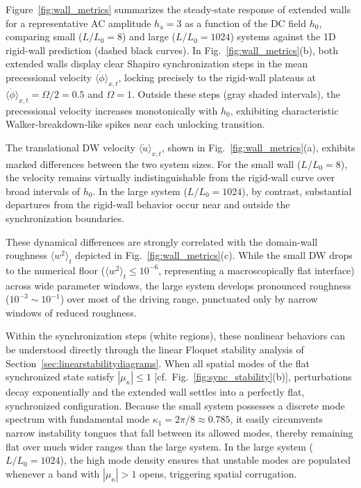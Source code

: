 \documentclass[prb,aps,twocolumn,superscriptaddress,floatfix]{revtex4-1}
\begin{document}
{{Figure~\ref{fig:wall_metrics} summarizes the steady-state response of extended walls for a representative AC amplitude $h_\text{a}=3$ as a function of the DC field $h_0$, comparing small ($L/L_0=8$) and large ($L/L_0=1024$) systems against the 1D rigid-wall prediction (dashed black curves). 
In Fig.~\ref{fig:wall_metrics}(b), both extended walls display clear Shapiro synchronization steps in the mean precessional velocity $\langle\dot\phi\rangle_{x,t}$, locking precisely to the rigid-wall plateaus at $\langle\dot\phi\rangle_{x,t} = \Omega/2 = 0.5$ and $\Omega = 1$. Outside these steps (gray shaded intervals), the precessional velocity increases monotonically with $h_0$, exhibiting characteristic Walker-breakdown-like spikes near each unlocking transition.

The translational DW velocity $\langle\dot u\rangle_{x,t}$, shown in Fig.~\ref{fig:wall_metrics}(a), exhibits marked differences between the two system sizes. For the small wall ($L/L_0=8$), the velocity remains virtually indistinguishable from the rigid-wall curve over broad intervals of $h_0$. In the large system ($L/L_0=1024$), by contrast, substantial departures from the rigid-wall behavior occur near and outside the synchronization boundaries.

These dynamical differences are strongly correlated with the domain-wall roughness $\langle w^2\rangle_t$ depicted in Fig.~\ref{fig:wall_metrics}(c). While the small DW drops to the numerical floor ($\langle w^2\rangle_t \le 10^{-6}$, representing a macroscopically flat interface) across wide parameter windows, the large system develops pronounced roughness ($10^{-3} \sim 10^{-1}$) over most of the driving range, punctuated only by narrow windows of reduced roughness.

Within the synchronization steps (white regions), these nonlinear behaviors can be understood directly through the linear Floquet stability analysis of Section~\ref{sec:linearstabilitydiagrams}. When all spatial modes of the flat synchronized state satisfy $|\mu_\kappa| \le 1$ [cf.~Fig.~\ref{fig:sync_stability}(b)], perturbations decay exponentially and the extended wall settles into a perfectly flat, synchronized configuration. Because the small system possesses a discrete mode spectrum with fundamental mode $\kappa_1 = 2\pi/8 \approx 0.785$, it easily circumvents narrow instability tongues that fall between its allowed modes, thereby remaining flat over much wider ranges than the large system. In the large system ($L/L_0=1024$), the high mode density ensures that unstable modes are populated whenever a band with $|\mu_\kappa|>1$ opens, triggering spatial corrugation.

}}
\end{document}
